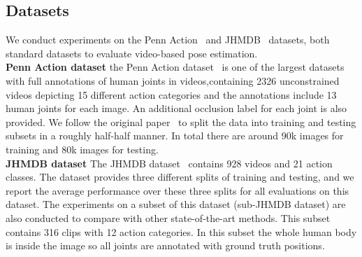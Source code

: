 \documentclass[10pt,twocolumn,letterpaper]{article}
\begin{document}


\subsection{Datasets}\noindent We conduct experiments on the Penn Action~\cite{Zhang2013From} and JHMDB~\cite{Jhuang:ICCV:2013} datasets, both standard datasets to evaluate video-based pose estimation.\\

\noindent\textbf{Penn Action dataset}
the Penn Action dataset~\cite{Zhang2013From} is one of the largest datasets with full annotations of human joints in videos,containing 2326 unconstrained videos depicting 15 different action categories and the annotations include 13 human joints for each image. An additional occlusion label for each joint is also provided. We follow the original paper~\cite{Zhang2013From} to split the data into training and testing subsets in a roughly half-half manner. In total there are around 90k images for training and 80k images for testing.\\

\noindent\textbf{JHMDB dataset}
The JHMDB dataset~\cite{Jhuang:ICCV:2013} contains 928 videos and 21 action classes. The dataset provides three different splits of training and testing, and we report the average performance over these three splits for all evaluations on this dataset. The experiments on a subset of this dataset (sub-JHMDB dataset) are also conducted to compare with other state-of-the-art methods. This subset contains 316 clips with 12 action categories. In this subset the whole human body is inside the image so all joints are annotated with ground truth positions.
\end{document}
